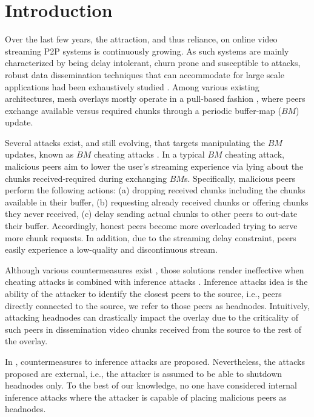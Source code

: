 \section{Introduction}
\label{sec:intro}

Over the last few years, the attraction, and thus reliance, on online video streaming P2P systems is continuously growing. 
As such systems are mainly characterized by being delay intolerant, churn prone and susceptible to attacks, robust data dissemination techniques that can accommodate for large scale applications had been exhaustively studied \cite{sasi2014survey}.
Among various existing architectures, mesh overlays mostly operate in a pull-based fashion \cite{zhang2014modeling}, where peers exchange available versus required chunks through a periodic buffer-map ($BM$) update.

Several attacks exist, and still evolving, that targets manipulating the $BM$ updates, known as $BM$ cheating attacks \cite{cheatingAnalysis}.
In a typical $BM$ cheating attack, malicious peers aim to lower the user's streaming experience via lying about the chunks received-required during exchanging $BM$s. 
Specifically, malicious peers perform the following actions: 
(a) dropping received chunks including the chunks available in their buffer,
(b) requesting already received chunks or offering chunks they never received,
(c) delay sending actual chunks to other peers to out-date their buffer.
Accordingly, honest peers become more overloaded trying to serve more chunk requests.
In addition, due to the streaming delay constraint, peers easily experience a low-quality and discontinuous stream.

Although various countermeasures exist \cite{zhang2005coolstreaming, defending2, antiliar}, those solutions render ineffective when cheating attacks is combined with inference attacks \cite{nguyen2016swap,4395124,rbcs}.
Inference attacks idea is the ability of the attacker to identify the closest peers to the source, i.e., peers directly connected to the source, we refer to those peers as headnodes.
Intuitively, attacking headnodes can drastically impact the overlay due to the criticality of such peers in dissemination video chunks received from the source to the rest of the overlay.

In \cite{nguyen2016swap, rbcs, nguyen2014resilience}, countermeasures to inference attacks are proposed. 
Nevertheless, the attacks proposed are external, i.e., the attacker is assumed to be able to shutdown headnodes only.
To the best of our knowledge, no one have considered internal inference attacks where the attacker is capable of placing malicious peers as headnodes.


